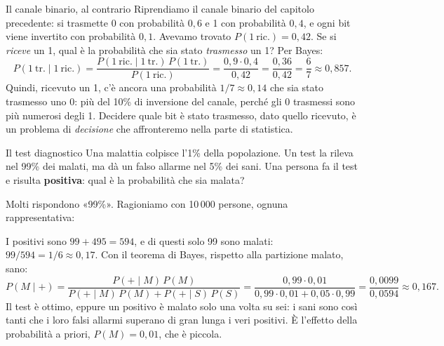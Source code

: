 \begin{esempio}{Il canale binario, al contrario}
Riprendiamo il canale binario del capitolo precedente: si trasmette 0 con probabilità $0{,}6$ e 1 con probabilità
$0{,}4$, e ogni bit viene invertito con probabilità $0{,}1$. Avevamo trovato $P(1\ \text{ric.}) = 0{,}42$. Se si
\emph{riceve} un 1, qual è la probabilità che sia stato \emph{trasmesso} un 1? Per Bayes:
\[
  P(1\ \text{tr.} \mid 1\ \text{ric.}) = \frac{P(1\ \text{ric.} \mid 1\ \text{tr.})\,P(1\ \text{tr.})}{P(1\ \text{ric.})}
  = \frac{0{,}9 \cdot 0{,}4}{0{,}42} = \frac{0{,}36}{0{,}42} = \frac{6}{7} \approx 0{,}857 .
\]
Quindi, ricevuto un 1, c'è ancora una probabilità $1/7 \approx 0{,}14$ che sia stato trasmesso uno 0: più del 10\% di
inversione del canale, perché gli 0 trasmessi sono più numerosi degli 1. Decidere quale bit è stato trasmesso, dato
quello ricevuto, è un problema di \emph{decisione} che affronteremo nella parte di statistica.
\end{esempio}

\begin{esempio}{Il test diagnostico}
Una malattia colpisce l'1\% della popolazione. Un test la rileva nel 99\% dei malati, ma dà un falso allarme nel 5\%
dei sani. Una persona fa il test e risulta \textbf{positiva}: qual è la probabilità che sia malata?

Molti rispondono «99\%». Ragioniamo con 10\,000 persone, ognuna rappresentativa:
\begin{center}
\end{center}
I positivi sono $99 + 495 = 594$, e di questi solo 99 sono malati: $99/594 = 1/6 \approx 0{,}17$. Con il teorema di
Bayes, rispetto alla partizione {malato, sano}:
\[
  P(M \mid +) = \frac{P(+ \mid M)\,P(M)}{P(+ \mid M)\,P(M) + P(+ \mid S)\,P(S)}
  = \frac{0{,}99 \cdot 0{,}01}{0{,}99 \cdot 0{,}01 + 0{,}05 \cdot 0{,}99} = \frac{0{,}0099}{0{,}0594} \approx 0{,}167 .
\]
Il test è ottimo, eppure un positivo è malato solo una volta su sei: i sani sono così tanti che i loro falsi allarmi
superano di gran lunga i veri positivi. È l'effetto della probabilità a priori, $P(M) = 0{,}01$, che è piccola.
\end{esempio}

